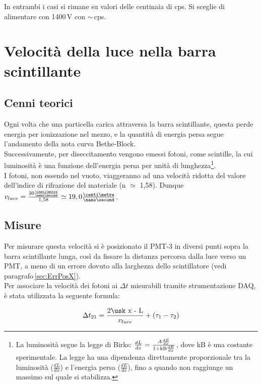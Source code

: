 \documentclass[a4paper,twocolumn]{article}
\begin{document}
In entrambi i casi si rimane su valori delle centinaia di cps. Si sceglie di alimentare con 1400\,V con $\sim$\,cps.



\section{Velocità della luce nella barra scintillante}
\label{sec:VLuce}
\subsection{Cenni teorici}
Ogni volta che una particella carica attraversa la barra scintillante, questa perde energia per ionizzazione nel mezzo, e la quantità di energia persa segue l'andamento della nota curva Bethe-Block.\\
Successivamente, per diseccitamento vengono emessi fotoni, come scintille, la cui luminosità è una funzione dell'energia persa per unità di lunghezza\footnote{La luminosità segue la legge di Birks: $\frac{dL}{dx} = \frac{A\frac{dE}{dx}}{1+\textnormal{kB}\frac{dE}{dx}}$, dove kB è una costante sperimentale. La legge ha una dipendenza direttamente proporzionale tra la luminosità ($\frac{dL}{dx}$) e l'energia persa ($\frac{dE}{dx}$), fino a quando non raggiunge un massimo sul quale si stabilizza.}.\\
I fotoni, non essendo nel vuoto, viaggeranno ad una velocità ridotta del valore dell'indice di rifrazione del materiale (n $\simeq$ 1,58). Dunque $v_{luce} = \frac{30\frac{\centi\metre}{\nano\second}}{1,58} \simeq 19,0 \frac{\centi\metre}{\nano\second}$.

\subsection{Misure}
Per misurare questa velocità si è posizionato il PMT-3 in diversi punti sopra la barra scintillante lunga, così da fissare la distanza percorsa dalla luce verso un PMT, a meno di un errore dovuto alla larghezza dello scintillatore (vedi paragrafo\,\ref{sec:ErrPosX}).\\
Per associare la velocità dei fotoni ai $\Delta t$ misurabili tramite strumentazione DAQ, è stata utilizzata la seguente formula:

\begin{equation}
\Delta t_{21} = \frac{\textnormal{2\usk x - L}}{v_{luce}} + (\tau_1 - \tau_2)
\label{equ:VLuceBarra}
\end{equation}
\end{document}
